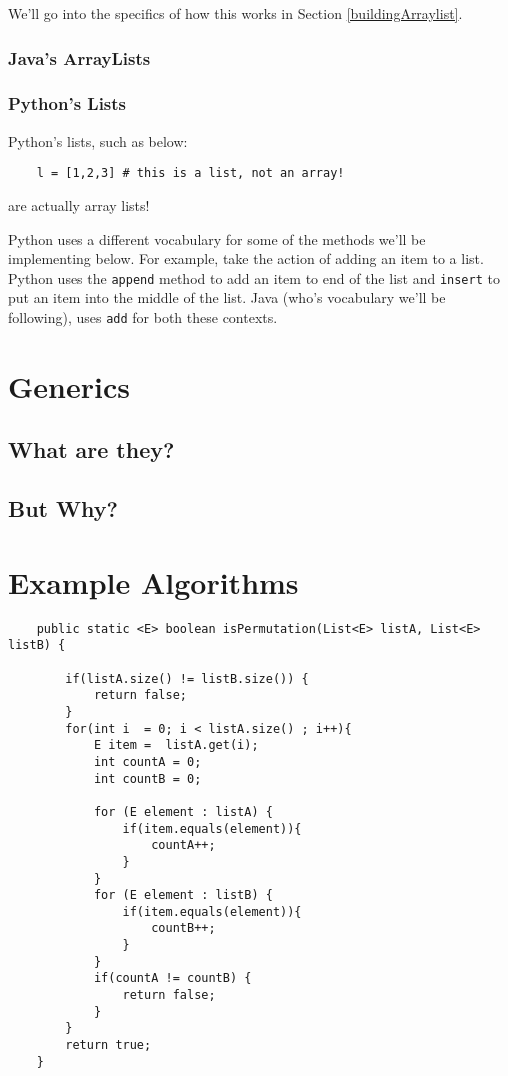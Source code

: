 We'll go into the specifics of how this works in Section \ref{buildingArraylist}.


\subsubsection{Java's ArrayLists}
\subsubsection{Python's Lists}
Python's lists, such as below:
\begin{verbatim}
	l = [1,2,3] # this is a list, not an array!	
\end{verbatim}
are actually array lists! %

Python uses a different vocabulary for some of the methods we'll be implementing below.  
For example, take the action of adding an item to a list.
Python uses the \texttt{append} method to add an item to end of the list and \texttt{insert} to put an item into the middle of the list.
Java (who's vocabulary we'll be following), uses \texttt{add} for both these contexts. 





\section{Generics}


\subsection{What are they?}

\subsection{But Why?}




\section{Example Algorithms}


\begin{verbatim}
	public static <E> boolean isPermutation(List<E> listA, List<E> listB) {
		
		if(listA.size() != listB.size()) {
			return false;
		}
		for(int i  = 0; i < listA.size() ; i++){
			E item =  listA.get(i);
			int countA = 0;
			int countB = 0;
			
			for (E element : listA) {
				if(item.equals(element)){
					countA++;
				}
			}
			for (E element : listB) {
				if(item.equals(element)){
					countB++;
				}
			}
			if(countA != countB) {
				return false;
			}
		}
		return true;
	}
\end{verbatim}



